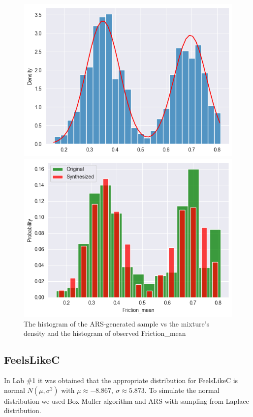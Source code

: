 \documentclass[12pt, bachelor, substylefile = algo_title.rtx]{disser}
\theoremstyle{definition}
\begin{document}
\begin{figure}[!h]
   \begin{minipage}{.48\textwidth}
     \includegraphics[width=\linewidth]{ars0}
   \end{minipage} \hfill
\begin{minipage}{.48\textwidth}
     \includegraphics[width=\linewidth]{ars1}
   \end{minipage}
\caption{The histogram of the ARS-generated sample vs the mixture's density and the histogram of observed Friction\_mean}
\label{fig: 6}
\end{figure}

\subsection*{FeelsLikeC}
In Lab \#1 it was obtained that the appropriate distribution for FeelsLikeC is normal $N(\mu, \sigma^2)$ with $\mu \approx -8.867,\ \sigma \approx 5.873$. To simulate the normal distribution we used Box-Muller algorithm and ARS with sampling from Laplace distribution.
\end{document}

